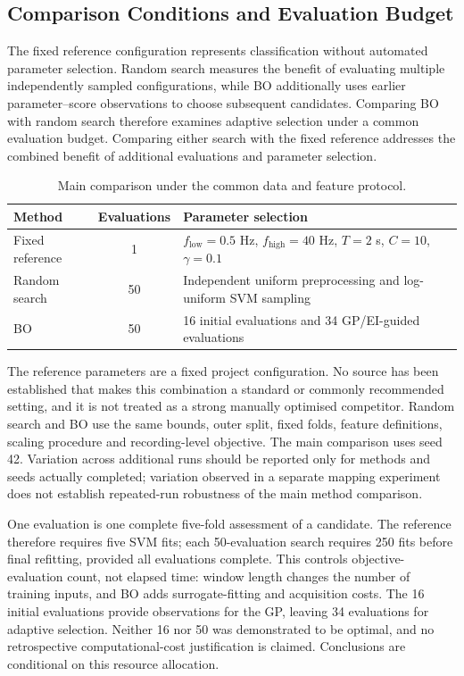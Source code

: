\subsection{Comparison Conditions and Evaluation Budget}
\label{subsec:comparison-conditions}

The fixed reference configuration represents classification without automated
parameter selection. Random search measures the benefit of evaluating multiple
independently sampled configurations, while BO additionally uses earlier
parameter--score observations to choose subsequent candidates. Comparing BO
with random search therefore examines adaptive selection under a common
evaluation budget. Comparing either search with the fixed reference addresses
the combined benefit of additional evaluations and parameter selection.

\begin{table}[htbp]
\centering
\caption{Main comparison under the common data and feature protocol.}
\label{tab:method-budget}
\renewcommand{\arraystretch}{1.15}
\begin{tabular}{lcp{}}
\hline
Method & Evaluations & Parameter selection \\
\hline
Fixed reference & 1 & $f_{\mathrm{low}}=0.5$ Hz, $f_{\mathrm{high}}=40$ Hz, $T=2$ s, $C=10$, $\gamma=0.1$ \\
Random search & 50 & Independent uniform preprocessing and log-uniform SVM sampling \\
BO & 50 & 16 initial evaluations and 34 GP/EI-guided evaluations \\
\hline
\end{tabular}
\end{table}

The reference parameters are a fixed project configuration. No source has
been established that makes this combination a standard or commonly recommended
setting, and it is not treated as a strong manually optimised competitor.
Random search and BO use the same bounds, outer split, fixed folds,
feature definitions, scaling procedure and recording-level objective.
The main comparison uses seed 42. Variation across additional runs should
be reported only for methods and seeds actually completed; variation observed
in a separate mapping experiment does not establish repeated-run robustness
of the main method comparison.

One evaluation is one complete five-fold assessment of a candidate. The
reference therefore requires five SVM fits; each 50-evaluation search requires
250 fits before final refitting, provided all evaluations complete. This
controls objective-evaluation count, not elapsed time: window length changes
the number of training inputs, and BO adds surrogate-fitting and acquisition
costs. The 16 initial evaluations provide observations for the GP, leaving
34 evaluations for adaptive selection. Neither 16 nor 50 was demonstrated
to be optimal, and no retrospective computational-cost justification is
claimed. Conclusions are conditional on this resource allocation.

